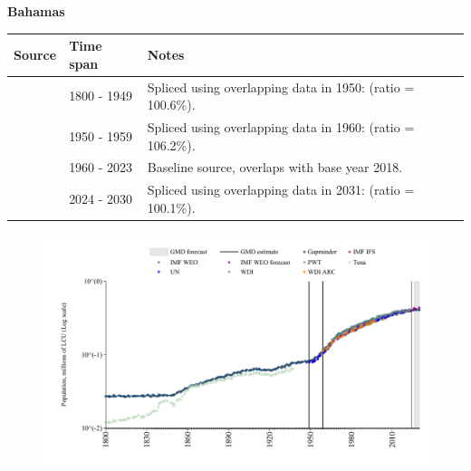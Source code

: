 \documentclass[12pt,a4paper,landscape]{article}
\begin{document}
\begin{adjustbox}{max totalsize={\paperwidth}{\paperheight},center}
\begin{minipage}[t][\textheight][t]{\textwidth}
\vspace*{0.5cm}
{}
\begin{center}
{\Large\bfseries Bahamas}
\end{center}
\vspace{0.5cm}
\begin{table}[H]
\centering
\small
\begin{tabular}{|l|l|l|}
\hline
\textbf{Source} & \textbf{Time span} & \textbf{Notes} \\
\hline
\rowcolor{white}\cite{Gapminder}& 1800 - 1949 &Spliced using overlapping data in 1950: (ratio = 100.6\%).\\
\rowcolor{lightgray}\cite{IMF_IFS}& 1950 - 1959 &Spliced using overlapping data in 1960: (ratio = 106.2\%).\\
\rowcolor{white}\cite{WDI}& 1960 - 2023 &Baseline source, overlaps with base year 2018.\\
\rowcolor{lightgray}\cite{Gapminder}& 2024 - 2030 &Spliced using overlapping data in 2031: (ratio = 100.1\%).\\
\hline
\end{tabular}
\end{table}
\begin{figure}[H]
\centering
\includegraphics[width=\textwidth,height=0.6\textheight,keepaspectratio]{graphs/BHS_pop.pdf}
\end{figure}
\end{minipage}
\end{adjustbox}
\end{document}
